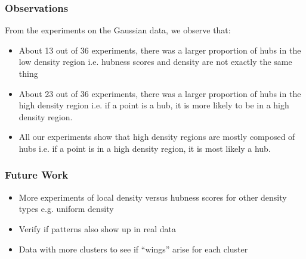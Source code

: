 \documentclass{beamer}
\begin{document}
\begin{frame}
\frametitle{Observations}

From the experiments on the Gaussian data, we observe that:

\begin{itemize}
\item About 13 out of 36 experiments, there was a larger proportion of hubs in the low density region i.e. hubness scores and density are not exactly the same thing
\item About 23 out of 36 experiments, there was a larger proportion of hubs in the high density region i.e. if a point is a hub, it is more likely to be in a high density region.
\item All our experiments show that high density regions are mostly composed of hubs i.e. if a point is in a high density region, it is most likely a hub.
\end{itemize}

\end{frame}

\begin{frame}
\frametitle{Future Work}

\begin{itemize}
\item More experiments of local density versus hubness scores for other density types e.g. uniform density
\item Verify if patterns also show up in real data
\item Data with more clusters to see if ``wings'' arise for each cluster
\end{itemize}

\end{frame}

\end{document}

